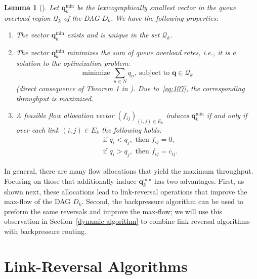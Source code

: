 \documentclass{sig-alternate-2013}
\newtheorem{lemma}{Lemma}
\begin{document}
\begin{lemma}[\cite{georgiadis}] \label{lem:201}
Let $\bm{q}_{k}^{\text{min}}$ be the lexicographically smallest vector in the queue overload region $\mathcal{Q}_{k}$ of the DAG $D_{k}$. We have the following properties:
\begin{enumerate}
\itemsep0em 
\item The vector $\bm{q}_{k}^{\text{min}}$ exists and is unique in the set $\mathcal{Q}_{k}$.
\item The vector $\bm{q}_{k}^{\text{min}}$ minimizes the sum of queue overload rates, i.e., it is a solution to the optimization problem:
\[
\text{minimize } \sum_{n\in N} q_{n}, \ \text{subject to } \bm{q} \in \mathcal{Q}_{k}
\]
(direct consequence of Theorem 1 in \cite{georgiadis}). Due to~\eqref{eq:107}, the corresponding throughput is maximized.
\item  A feasible flow allocation vector $(f_{ij})_{(i, j) \in E_{k}}$ induces $\bm{q}_{k}^{\text{min}}$ if and only if over each link $(i, j)\in E_{k}$ the following holds:
\begin{align}
&\text{if } q_i < q_j, \text{ then } f_{ij} = 0, \label{property1}\\
&\text{if }q_i > q_j, \text{ then } f_{ij} = c_{ij} \label{property2}.
\end{align} 
\end{enumerate}

\end{lemma}

In general, there are many flow allocations that yield the maximum throughput. Focusing on those that additionally induce $\bm{q}^{\text{min}}_{k}$ has two advantages. First, as  shown next, these allocations lead to link-reversal operations that improve the max-flow of the DAG $D_{k}$. Second, the backpressure algorithm can be used to preform the same reversals and improve the max-flow; we will use this observation in Section~\ref{dynamic algorithm} to combine link-reversal algorithms with backpressure routing.



\section{Link-Reversal Algorithms} \label{sec:link_reversal}
\end{document}
